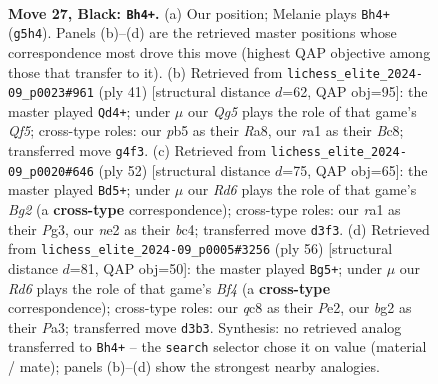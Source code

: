 \documentclass[11pt]{article}
\begin{document}
\clearpage

\begin{figure}[p]\centering
\begin{subfigure}{0.46\textwidth}\centering
\resizebox{\linewidth}{!}{%
\newchessgame
\chessboard[
  setfen={2Q5/pp1n2kp/7p/1P4b1/3P2q1/3r4/4N1B1/R3K2R b - - 1 27},
  showmover=false,
  pgfstyle=straightmove, color=movearrow, markmove={g5-h4}
]}
\caption{}
\end{subfigure}\hfill
\begin{subfigure}{0.46\textwidth}\centering
\resizebox{\linewidth}{!}{%
\newchessgame
\chessboard[
  setfen={r1b5/ppp1k1bQ/6p1/3p2P1/2B2q2/8/P2N2P1/1R4K1 b - - 1 21},
  showmover=false,
  pgfstyle=straightmove, color=movearrow, markmove={f4-d4}
]}
\caption{}
\end{subfigure}
\\[4pt]
\begin{subfigure}{0.46\textwidth}\centering
\resizebox{\linewidth}{!}{%
\newchessgame
\chessboard[
  setfen={2r3k1/pp5p/5qpB/4N3/2bQ4/6PP/P4PB1/6K1 w - - 5 27},
  showmover=false,
  pgfstyle=straightmove, color=movearrow, markmove={g2-d5}
]}
\caption{}
\end{subfigure}\hfill
\begin{subfigure}{0.46\textwidth}\centering
\resizebox{\linewidth}{!}{%
\newchessgame
\chessboard[
  setfen={r2kN2r/p5b1/6p1/8/Q1P2B2/P2n2Nq/4P2P/6K1 w - - 2 29},
  showmover=false,
  pgfstyle=straightmove, color=movearrow, markmove={f4-g5}
]}
\caption{}
\end{subfigure}
\caption{\textbf{Move 27, Black: \texttt{Bh4+}.} (a) Our position; Melanie plays \texttt{Bh4+} (\texttt{g5h4}). Panels (b)--(d) are the retrieved master positions whose correspondence most drove this move (highest QAP objective among those that transfer to it). (b) Retrieved from \texttt{lichess\_elite\_2024-09\_p0023\#961} (ply 41) [structural distance $d$=62, QAP obj=95]: the master played \texttt{Qd4+}; under $\mu$ our \emph{Qg5} plays the role of that game's \emph{Qf5}; cross-type roles: our \emph{p}b5 as their \emph{R}a8, our \emph{r}a1 as their \emph{B}c8; transferred move \texttt{g4f3}. (c) Retrieved from \texttt{lichess\_elite\_2024-09\_p0020\#646} (ply 52) [structural distance $d$=75, QAP obj=65]: the master played \texttt{Bd5+}; under $\mu$ our \emph{Rd6} plays the role of that game's \emph{Bg2} (a \textbf{cross-type} correspondence); cross-type roles: our \emph{r}a1 as their \emph{P}g3, our \emph{n}e2 as their \emph{b}c4; transferred move \texttt{d3f3}. (d) Retrieved from \texttt{lichess\_elite\_2024-09\_p0005\#3256} (ply 56) [structural distance $d$=81, QAP obj=50]: the master played \texttt{Bg5+}; under $\mu$ our \emph{Rd6} plays the role of that game's \emph{Bf4} (a \textbf{cross-type} correspondence); cross-type roles: our \emph{q}c8 as their \emph{P}e2, our \emph{b}g2 as their \emph{P}a3; transferred move \texttt{d3b3}. Synthesis: no retrieved analog transferred to \texttt{Bh4+} -- the \texttt{search} selector chose it on value (material / mate); panels (b)--(d) show the strongest nearby analogies.}
\label{fig:thought-m53}
\end{figure}
\end{document}
